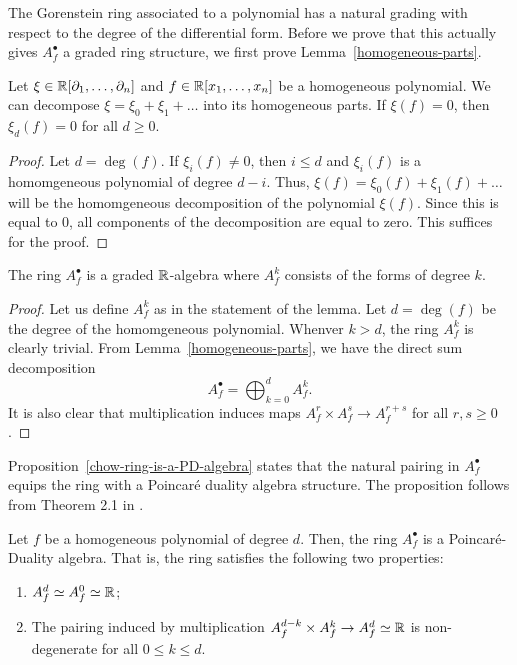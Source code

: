 \documentclass{puthesis-UG}
\begin{document}
The Gorenstein ring associated to a polynomial has a natural grading with respect to the degree of the differential form. Before we prove that this actually gives $A_f^\bullet$ a graded ring structure, we first prove Lemma~\ref{homogeneous-parts}.

\begin{lem} \label{homogeneous-parts}
	Let $\xi \in \mathbb{R}[\partial_1, \ldots, \partial_n]$ and $f \in \mathbb{R}[x_1, \ldots, x_n]$ be a homogeneous polynomial. We can decompose $\xi = \xi_0 + \xi_1 + \ldots$ into its homogeneous parts. If $\xi (f) = 0$, then $\xi_d (f) = 0$ for all $d \geq 0$. 
\end{lem}

\begin{proof}
	Let $d = \deg (f)$. If $\xi_i (f) \neq 0$, then $i \leq d$ and $\xi_i(f)$ is a homomgeneous polynomial of degree $d-i$. Thus, $\xi (f) = \xi_0 (f) + \xi_1(f) + \ldots$ will be the homomgeneous decomposition of the polynomial $\xi(f)$. Since this is equal to $0$, all components of the decomposition are equal to zero. This suffices for the proof. 
\end{proof}

\begin{prop}
	The ring $A_f^\bullet$ is a graded $\mathbb{R}$-algebra where $A_f^k$ consists of the forms of degree $k$. 
\end{prop}

\begin{proof}
	Let us define $A_f^k$ as in the statement of the lemma. Let $d = \deg (f)$ be the degree of the homomgeneous polynomial. Whenver $k > d$, the ring $A_f^k$ is clearly trivial. From Lemma~\ref{homogeneous-parts}, we have the direct sum decomposition 
	\[
		A_f^\bullet = \bigoplus_{k = 0}^d A_f^k.
	\]
	It is also clear that multiplication induces maps $A_f^r \times A_f^s \to A_f^{r+s}$ for all $r, s \geq 0$.
\end{proof}

Proposition~\ref{chow-ring-is-a-PD-algebra} states that the natural pairing in $A_f^\bullet$ equips the ring with a Poincar\'e duality algebra structure. The proposition follows from Theorem 2.1 in \cite{maeno2009lefschetz}. 
\begin{prop} \label{chow-ring-is-a-PD-algebra}
	Let $f$ be a homogeneous polynomial of degree $d$. Then, the ring $A_f^\bullet$ is a Poincar\'e-Duality algebra. That is, the ring satisfies the following two properties:
	\begin{enumerate}[label = (\alph*)]
		\item $A_f^d \simeq A_f^0 \simeq \mathbb{R}$;

		\item The pairing induced by multiplication $A_f^{d-k} \times A_f^k \to A_f^d \simeq \mathbb{R}$ is non-degenerate for all $0 \leq k \leq d$. 
	\end{enumerate}
\end{prop}
\end{document}
